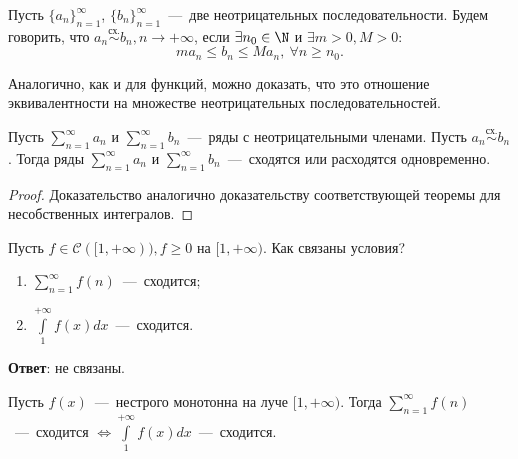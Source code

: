 \begin{definition}
    Пусть $\{a_n\}_{n = 1}^{\infty}$, $\{b_n\}_{n = 1}^{\infty}$~---~две неотрицательных последовательности. Будем говорить, что $a_n \overset{\text{сх.}}{\sim} b_n, n \rightarrow +\infty$, если $\exists n_0 \in \N$ и $\exists m > 0, M > 0$: $$ma_n \le b_n \le Ma_n, \ \forall n \ge n_0.$$
\end{definition}

\begin{remark}
    Аналогично, как и для функций, можно доказать, что это отношение эквивалентности на множестве неотрицательных последовательностей.
\end{remark}

\begin{theorem}
    Пусть $\sum_{n = 1}^{\infty} a_n$ и $\sum_{n = 1}^{\infty} b_n$~---~ряды с неотрицательными членами. Пусть $a_n \overset{\text{сх.}}{\sim} b_n$. Тогда ряды $\sum_{n = 1}^{\infty} a_n$ и $\sum_{n = 1}^{\infty} b_n$~---~сходятся или расходятся одновременно.  
\end{theorem}

\begin{proof}
    Доказательство аналогично доказательству соответствующей теоремы для несобственных интегралов.
\end{proof}

\begin{question}
    Пусть $f \in \mathcal{C}([1, + \infty)), f \ge 0$ на $[1, + \infty)$. Как связаны условия? 
    \begin{enumerate}
        \item $\sum_{n = 1}^{\infty} f(n)$~---~сходится;
        \item $\int\limits_{1}^{+\infty} f(x) dx$~---~сходится.
    \end{enumerate}

    \textbf{Ответ}: не связаны.
\end{question}


\begin{theorem}
    Пусть $f(x)$~---~нестрого монотонна на луче $[1, +\infty)$. Тогда $\sum_{n = 1}^{\infty} f(n)$~---~сходится $\Leftrightarrow \int\limits_{1}^{+\infty}f(x)dx $~---~сходится. 
\end{theorem}

